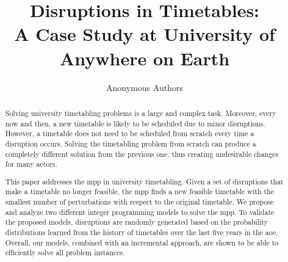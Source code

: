 \documentclass[runningheads]{llncs}
\title{Disruptions in Timetables: \\ \large  A Case Study at University of Anywhere on Earth} %
\author{Anonymous Authors}
\institute{University of Anywhere on Earth}
\newcommand{\uni}{\gls{aoe}}
\begin{document}
\maketitle 

\begin{abstract}
Solving university timetabling problems is a large and complex task. Moreover, every now and then, a new timetable is likely to be scheduled due to minor disruptions. However, a timetable does not need to be scheduled from scratch every time a disruption occurs. Solving the timetabling problem from scratch can produce a completely different solution from the previous one, thus creating undesirable changes for many actors. 

This paper addresses the \gls{mpp} in university timetabling. Given a set of disruptions that make a timetable no longer feasible, the \gls{mpp} finds a new feasible timetable with the smallest number of perturbations with respect to the original timetable. We propose and analyze two different integer programming models to solve the \gls{mpp}. To validate the proposed models, disruptions are randomly generated based on the probability distributions learned from the history of timetables over the last five years in the \uni. Overall, our models, combined with an incremental approach, are shown to be able to efficiently solve all problem instances.



   


\end{abstract}
\end{document}

